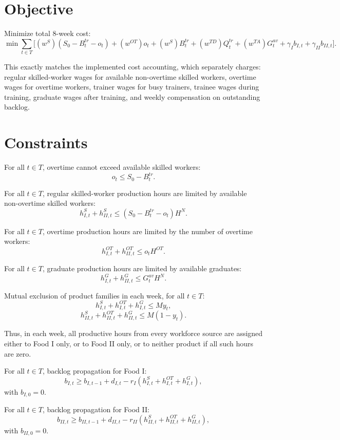 \section*{Objective}

Minimize total 8-week cost:
\[
\min \sum_{t\in T}
\Big[
(w^S)(S_0-B_t^{tr}-o_t)
+ (w^{OT})o_t
+ (w^S)B_t^{tr}
+ (w^{TD})Q_t^{tr}
+ (w^{TA})G_t^{av}
+ \gamma_I b_{I,t}
+ \gamma_{II} b_{II,t}
\Big].
\]

This exactly matches the implemented cost accounting, which separately charges:
regular skilled-worker wages for available non-overtime skilled workers,
overtime wages for overtime workers,
trainer wages for busy trainers,
trainee wages during training,
graduate wages after training,
and weekly compensation on outstanding backlog.

\section*{Constraints}

For all \(t\in T\), overtime cannot exceed available skilled workers:
\[
o_t \le S_0 - B_t^{tr}.
\]

For all \(t\in T\), regular skilled-worker production hours are limited by available non-overtime skilled workers:
\[
h^S_{I,t} + h^S_{II,t}
\le (S_0 - B_t^{tr} - o_t)H^N.
\]

For all \(t\in T\), overtime production hours are limited by the number of overtime workers:
\[
h^{OT}_{I,t} + h^{OT}_{II,t}
\le o_t H^{OT}.
\]

For all \(t\in T\), graduate production hours are limited by available graduates:
\[
h^G_{I,t} + h^G_{II,t}
\le G_t^{av} H^N.
\]

Mutual exclusion of product families in each week, for all \(t\in T\):
\[
h^S_{I,t} + h^{OT}_{I,t} + h^G_{I,t} \le M y_t,
\]
\[
h^S_{II,t} + h^{OT}_{II,t} + h^G_{II,t} \le M(1-y_t).
\]

Thus, in each week, all productive hours from every workforce source are assigned either to Food I only, or to Food II only, or to neither product if all such hours are zero.

For all \(t\in T\), backlog propagation for Food I:
\[
b_{I,t} \ge b_{I,t-1} + d_{I,t} - r_I\left(h^S_{I,t}+h^{OT}_{I,t}+h^G_{I,t}\right),
\]
with \(b_{I,0}=0\).

For all \(t\in T\), backlog propagation for Food II:
\[
b_{II,t} \ge b_{II,t-1} + d_{II,t} - r_{II}\left(h^S_{II,t}+h^{OT}_{II,t}+h^G_{II,t}\right),
\]
with \(b_{II,0}=0\).

